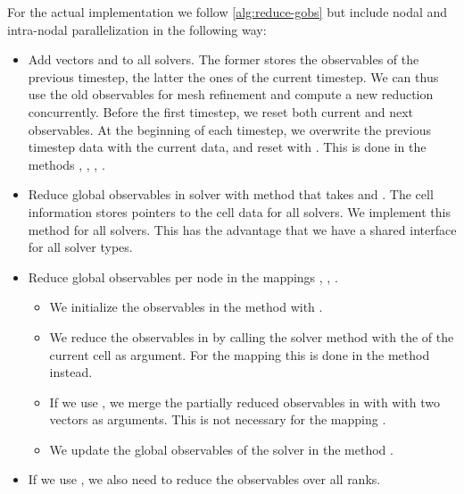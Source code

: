 For the actual implementation we follow \cref{alg:reduce-gobs} but include nodal and intra-nodal parallelization in the following way:
\begin{itemize}
\item Add vectors  and  to all solvers.
  The former stores the observables of the previous timestep, the latter the ones of the current timestep.
  We can thus use the old observables for mesh refinement and compute a new reduction concurrently.
  Before the first timestep, we reset both current and next observables.
  At the beginning of each timestep, we overwrite the previous timestep data with the current data, and reset  with .
  This is done in the methods , , , .
\item Reduce global observables in solver with method  that takes  and .
  The cell information stores pointers to the cell data for all solvers.
  We implement this method for all solvers.
  This has the advantage that we have a shared interface for all solver types.
\item Reduce global observables per node in the mappings , , .
  \begin{itemize}
  \item We initialize the observables in the method  with . 
  \item We reduce the observables in  by calling the solver method  with the  of the current cell as argument.
    For the mapping  this is done in the method  instead.
  \item If we use \tbb{}, we merge the partially reduced observables in  with  with two vectors as arguments.
    This is not necessary for the mapping .
   \item We update the global observables of the solver in the method .
  \end{itemize}
\item If we use \mpi{}, we also need to reduce the observables over all ranks.

\end{itemize}
